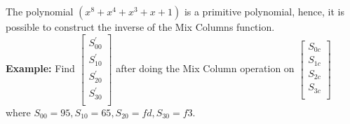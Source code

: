 \documentclass[11pt]{article}
\begin{document}
The polynomial $(x^8 + x^4 + x^3 + x + 1)$ is a primitive polynomial, hence, it is possible to construct the inverse of the Mix Columns function.\\
\newline
\textbf{Example:} Find $\begin{bmatrix}
        S_{00}^{'}\\
        S_{10}^{'}\\
        S_{20}^{'}\\
        S_{30}^{'}\\
    \end{bmatrix}$ after doing the Mix Column operation on $\begin{bmatrix}
        S_{0c}\\
        S_{1c}\\
        S_{2c}\\
        S_{3c}\\
    \end{bmatrix}$ where $S_{00} = 95, S_{10} = 65, S_{20} = fd, S_{30} = f3$.\\
\end{document}
